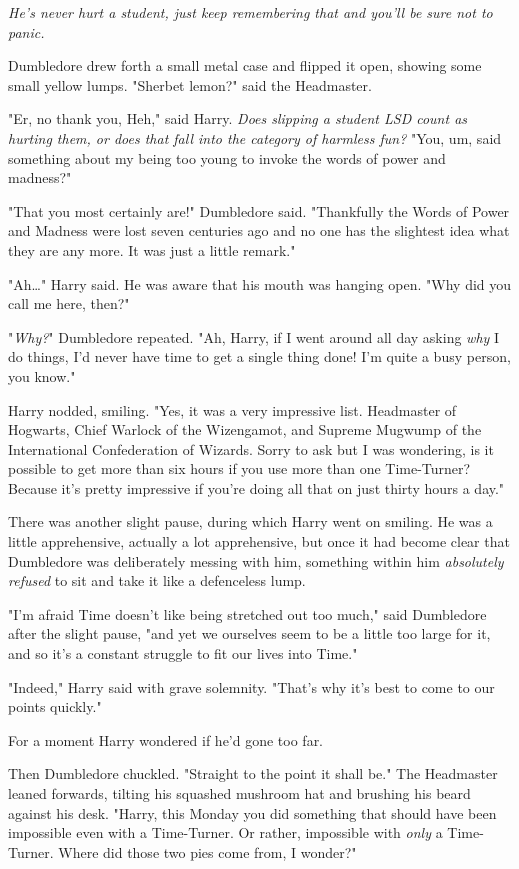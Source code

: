 \emph{He’s never hurt a student, just keep remembering that and you’ll be sure
not to panic.}

Dumbledore drew forth a small metal case and flipped it open, showing some
small yellow lumps. "Sherbet lemon?" said the Headmaster.

"Er, no thank you, Heh," said Harry. \emph{Does slipping a student LSD count as
hurting them, or does that fall into the category of harmless fun?} "You, um,
said something about my being too young to invoke the words of power and
madness?"

"That you most certainly are!" Dumbledore said. "Thankfully the Words of Power
and Madness were lost seven centuries ago and no one has the slightest idea
what they are any more. It was just a little remark."

"Ah…" Harry said. He was aware that his mouth was hanging open. "Why did
you call me here, then?"

"\emph{Why?}" Dumbledore repeated. "Ah, Harry, if I went around all day asking
\emph{why} I do things, I’d never have time to get a single thing done! I’m
quite a busy person, you know."

Harry nodded, smiling. "Yes, it was a very impressive list. Headmaster of
Hogwarts, Chief Warlock of the Wizengamot, and Supreme Mugwump of the
International Confederation of Wizards. Sorry to ask but I was wondering, is it
possible to get more than six hours if you use more than one Time-Turner?
Because it’s pretty impressive if you’re doing all that on just thirty hours a
day."

There was another slight pause, during which Harry went on smiling. He was a
little apprehensive, actually a lot apprehensive, but once it had become clear
that Dumbledore was deliberately messing with him, something within him
\emph{absolutely refused} to sit and take it like a defenceless lump.

"I’m afraid Time doesn’t like being stretched out too much," said Dumbledore
after the slight pause, "and yet we ourselves seem to be a little too large for
it, and so it’s a constant struggle to fit our lives into Time."

"Indeed," Harry said with grave solemnity. "That’s why it’s best to come to our
points quickly."

For a moment Harry wondered if he’d gone too far.

Then Dumbledore chuckled. "Straight to the point it shall be." The Headmaster
leaned forwards, tilting his squashed mushroom hat and brushing his beard
against his desk. "Harry, this Monday you did something that should have been
impossible even with a Time-Turner. Or rather, impossible with \emph{only} a
Time-Turner. Where did those two pies come from, I wonder?"

